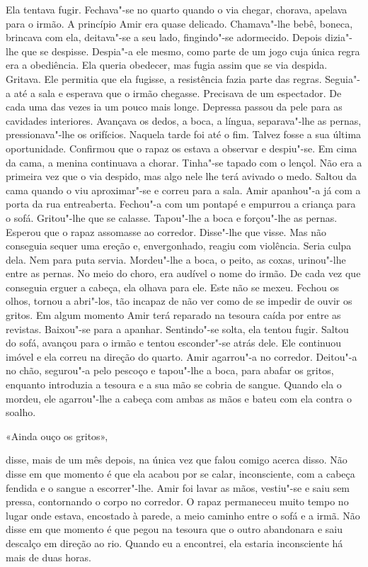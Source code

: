 Ela tentava fugir. Fechava"-se no quarto quando o via chegar, chorava,
apelava para o irmão. A princípio Amir era quase delicado. Chamava"-lhe
bebê, boneca, brincava com ela, deitava"-se a seu lado, fingindo"-se
adormecido. Depois dizia"-lhe que se despisse. Despia"-a ele mesmo, como
parte de um jogo cuja única regra era a obediência. Ela queria obedecer,
mas fugia assim que se via despida. Gritava. Ele permitia que ela
fugisse, a resistência fazia parte das regras. Seguia"-a até a sala e
esperava que o irmão chegasse. Precisava de um espectador. De cada uma
das vezes ia um pouco mais longe. Depressa passou da pele para as
cavidades interiores. Avançava os dedos, a boca, a língua, separava"-lhe
as pernas, pressionava"-lhe os orifícios. Naquela tarde foi até o fim.
Talvez fosse a sua última oportunidade. Confirmou que o rapaz os estava
a observar e despiu"-se. Em cima da cama, a menina continuava a chorar.
Tinha"-se tapado com o lençol. Não era a primeira vez que o via despido,
mas algo nele lhe terá avivado o medo. Saltou da cama quando o viu
aproximar"-se e correu para a sala. Amir apanhou"-a já com a porta da
rua entreaberta. Fechou"-a com um pontapé e empurrou a criança para o
sofá. Gritou"-lhe que se calasse. Tapou"-lhe a boca e forçou"-lhe as
pernas. Esperou que o rapaz assomasse ao corredor. Disse"-lhe que visse.
Mas não conseguia sequer uma ereção e, envergonhado, reagiu com
violência. Seria culpa dela. Nem para puta servia. Mordeu"-lhe a boca, o
peito, as coxas, urinou"-lhe entre as pernas. No meio do choro, era
audível o nome do irmão. De cada vez que conseguia erguer a cabeça, ela
olhava para ele. Este não se mexeu. Fechou os olhos, tornou a abri"-los,
tão incapaz de não ver como de se impedir de ouvir os gritos. Em algum
momento Amir terá reparado na tesoura caída por entre as revistas.
Baixou"-se para a apanhar. Sentindo"-se solta, ela tentou fugir. Saltou
do sofá, avançou para o irmão e tentou esconder"-se atrás dele. Ele
continuou imóvel e ela correu na direção do quarto. Amir agarrou"-a no
corredor. Deitou"-a no chão, segurou"-a pelo pescoço e tapou"-lhe a
boca, para abafar os gritos, enquanto introduzia a tesoura e a sua mão
se cobria de sangue. Quando ela o mordeu, ele agarrou"-lhe a cabeça com
ambas as mãos e bateu com ela contra o soalho.

«Ainda ouço os gritos»,

disse, mais de um mês depois, na única vez que falou comigo acerca
disso. Não disse em que momento é que ela acabou por se calar,
inconsciente, com a cabeça fendida e o sangue a escorrer"-lhe. Amir foi
lavar as mãos, vestiu"-se e saiu sem pressa, contornando o corpo no
corredor. O rapaz permaneceu muito tempo no lugar onde estava, encostado
à parede, a meio caminho entre o sofá e a irmã. Não disse em que momento
é que pegou na tesoura que o outro abandonara e saiu descalço em
direção ao rio. Quando eu a encontrei, ela estaria inconsciente há mais
de duas horas.

